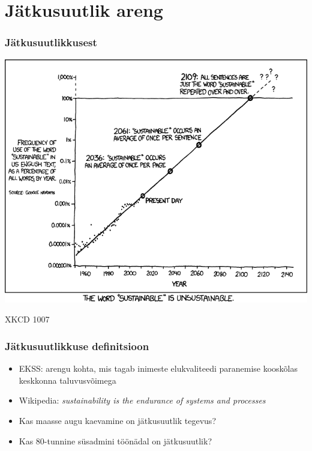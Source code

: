 \section{Jätkusuutlik areng}
\begin{frame}[fragile]
  \frametitle{Jätkusuutlikkusest}
  	\begin{center}
			\includegraphics[width=.72\textwidth]{sustainable.png}
	\end{center}
	XKCD 1007
\end{frame}

\begin{frame}[fragile]
  \frametitle{Jätkusuutlikkuse definitsioon}
	\begin{itemize}
		\item EKSS: arengu kohta, mis tagab inimeste elukvaliteedi paranemise kooskõlas keskkonna taluvusvõimega
		\item Wikipedia: \emph{sustainability is the endurance of systems and processes}
		\item Kas maasse augu kaevamine on jätkusuutlik tegevus?
		\item Kas 80-tunnine süsadmini töönädal on jätkusuutlik?
	\end{itemize}
\end{frame}

